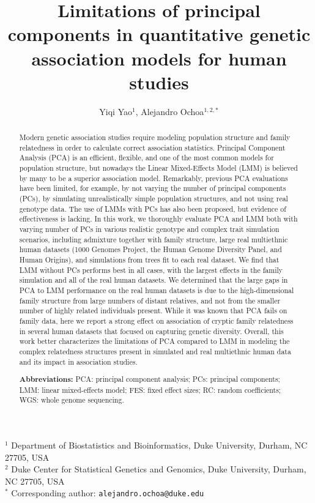 \documentclass[11pt]{article}
\title{\Large \textbf{
    Limitations of principal components in quantitative genetic association models for human studies
  }}
\author{Yiqi Yao$^1$, Alejandro Ochoa$^{1,2,*}$}
\date{}
\begin{document}
\maketitle

\noindent
$^1$ Department of Biostatistics and Bioinformatics, Duke University, Durham, NC 27705, USA \\
$^2$ Duke Center for Statistical Genetics and Genomics, Duke University, Durham, NC 27705, USA \\
$^*$ Corresponding author: \texttt{alejandro.ochoa@duke.edu}

\begin{abstract}
  Modern genetic association studies require modeling population structure and family relatedness in order to calculate correct association statistics.
  Principal Component Analysis (PCA) is an efficient, flexible, and one of the most common models for population structure, but nowadays the Linear Mixed-Effects Model (LMM) is believed by many to be a superior association model.
  Remarkably, previous PCA evaluations have been limited, for example, by not varying the number of principal components (PCs), by simulating unrealistically simple population structures, and not using real genotype data.
  The use of LMMs with PCs has also been proposed, but evidence of effectiveness is lacking.
  In this work, we thoroughly evaluate PCA and LMM both with varying number of PCs in various realistic genotype and complex trait simulation scenarios, including admixture together with family structure, large real multiethnic human datasets (1000 Genomes Project, the Human Genome Diversity Panel, and Human Origins), and simulations from trees fit to each real dataset.
  We find that LMM without PCs performs best in all cases, with the largest effects in the family simulation and all of the real human datasets.
  We determined that the large gaps in PCA to LMM performance on the real human datasets is due to the high-dimensional family structure from large numbers of distant relatives, and not from the smaller number of highly related individuals present.
  While it was known that PCA fails on family data, here we report a strong effect on association of cryptic family relatedness in several human datasets that focused on capturing genetic diversity.
  Overall, this work better characterizes the limitations of PCA compared to LMM in modeling the complex relatedness structures present in simulated and real multiethnic human data and its impact in association studies.


  \textbf{Abbreviations:}
  PCA: principal component analysis;
  PCs: principal components;
  LMM: linear mixed-effects model;
  FES: fixed effect sizes;
  RC: random coefficients;
  WGS: whole genome sequencing.
\end{abstract}
\end{document}
